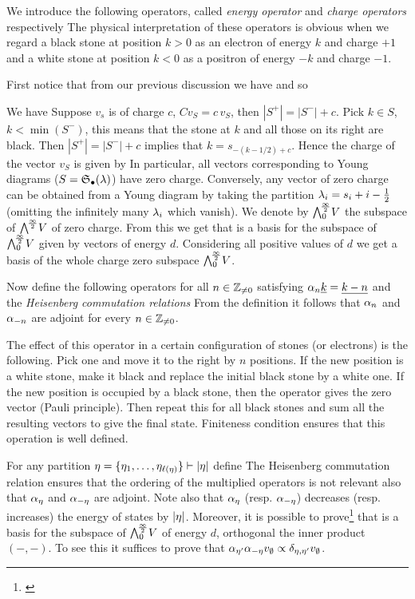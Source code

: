 \documentclass[../main/main.tex]{subfiles}
\begin{document}
We introduce the following operators, called \emph{energy operator} and \emph{charge operators} respectively
The physical interpretation of these operators is obvious when we regard a black stone at position $k>0$ as an electron of energy $k$ and charge $+1$ and a white stone at position $k<0$ as a positron of energy $-k$ and charge $-1$. 

First notice that from our previous discussion we have 
and so 


We have 
Suppose $v_s$ is of charge $c$, \ie $Cv_S=c\,v_S$, then $|S^+|=|S^-|+c$. Pick $k\in S$, $k<\min (S^-)$, this means that the stone at $k$ and all those on its right are black. Then $|S^+|=|S^-|+c$ implies that $k=s_{-(k-1/2)+c}$. Hence the charge of the vector $v_S$ is given by
In particular, all vectors corresponding to Young diagrams ($S=\mathfrak S_\bullet(\lambda)$) have zero charge. Conversely, any vector of zero charge can be obtained from a Young diagram by taking the partition $\lambda_i=s_i+i-\frac12$ (omitting the infinitely many $\lambda_i$ which vanish). We denote by $\bigwedge^{\!\frac\infty2}_0\!V$ the subspace of $\bigwedge^{\!\frac\infty2}\!V$ of zero charge. From this we get that 
is a basis for the subspace of $\bigwedge^{\!\frac\infty2}_0\!V$ given by vectors of energy $d$. Considering all positive values of $d$ we get a basis of the whole charge zero subspace $\bigwedge^{\!\frac\infty2}_0\!V$. 

Now define the following operators for all $n\in\mathbb Z_{\neq0}$
satisfying $\alpha_n\underline{k}=\underline{k-n}$ and the \emph{Heisenberg commutation relations}
From the definition it follows that $\alpha_n$ and $\alpha_{-n}$ are adjoint for every $n\in\mathbb Z_{\neq0}$.

The effect of this operator in a certain configuration of stones (or electrons) is the following. Pick one and move it to the right by $n$ positions. If the new position is a white stone, make it black and replace the initial black stone by a white one. If the new position is occupied by a black stone, then the operator gives the zero vector (Pauli principle). Then repeat this for all black stones and sum all the resulting vectors to give the final state. Finiteness condition ensures that this operation is well defined. 

For any partition $\eta=\{\eta_1,\ldots,\eta_{\ell(\eta)}\}\vdash|\eta|$ define
The Heisenberg commutation relation ensures that the ordering of the multiplied operators is not relevant also that $\alpha_\eta$ and $\alpha_{-\eta}$ are adjoint. Note also that $\alpha_{\eta}$ (resp. $\alpha_{-\eta}$) decreases (resp. increases) the energy of states by $|\eta|$. Moreover, it is possible to prove\footnote{\cite[Lemma 2.12]{J}} that 
is a basis for the subspace of $\bigwedge^{\!\frac\infty2}_0\!V$ of energy $d$, orthogonal \wrt the inner product $(-,-)$. To see this it suffices to prove that $\alpha_{\eta'}\alpha_{-\eta}v_\emptyset\propto \delta_{\eta,\eta'}v_\emptyset$.
\end{document}
